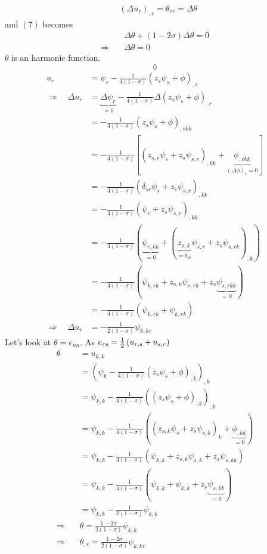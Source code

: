 \begin{align}
&\left(\Delta u_r\right)_{,r}=\theta_{rr}=\Delta \theta
\end{align}
and $(7)$ becomes
\begin{align}
&\Delta \theta+\left(1-2\sigma\right)\Delta \theta = 0\\
\Rightarrow\quad & \Delta \theta=0
\end{align}
$\theta$ is an harmonic function.
$$\lozenge$$
\begin{align}
u_r&=\psi_r-\frac{1}{4\left(1-\sigma\right)}\left(z_s\psi_s+\phi\right)_{,r}\\
\Rightarrow\quad \Delta u_r&=\underbrace{\Delta \psi_r}_{=0}-\frac{1}{4\left(1-\sigma\right)}\Delta \left(z_s\psi_s+ \phi\right)_{,r}\\
&=-\frac{1}{4\left(1-\sigma\right)} \left(z_s\psi_s+  \phi\right)_{,rkk}\\
&=-\frac{1}{4\left(1-\sigma\right)} \left[\left(z_{s,r}\psi_s+z_s\psi_{s,r}\right)_{,kk}+ \underbrace{\phi_{,rkk}}_{\left(\Delta\phi\right)_r=0}\right]\\
&=-\frac{1}{4\left(1-\sigma\right)} \left(\delta_{sr}\psi_s+z_s\psi_{s,r}\right)_{,kk}\\
&=-\frac{1}{4\left(1-\sigma\right)} \left(\psi_r+z_s\psi_{s,r}\right)_{,kk}\\
&=-\frac{1}{4\left(1-\sigma\right)} \left(\underbrace{\psi_{r,kk}}_{=0}+\left(\underbrace{z_{s,k}}_{= \delta_{sk}}\psi_{s,r}+z_s\psi_{s,rk}\right)_{,k}\right)\\
&=-\frac{1}{4\left(1-\sigma\right)} \left(\psi_{k,rk}+z_{s,k}\psi_{s,rk}+z_s\underbrace{\psi_{s,rkk}}_{=0}\right)\\
&=-\frac{1}{4\left(1-\sigma\right)} \left(\psi_{k,rk}+\psi_{k,rk}\right)\\
\Rightarrow\quad \Delta u_r&=-\frac{1}{2\left(1-\sigma\right)} \psi_{k,kr}
\end{align}
Let's look at $\theta=e_{nn}$. As $e_{rs}=\frac{1}{2}\left(u_{r,s}+u_{s,r}\right)$
\begin{align}
\theta &= u_{k,k}\\
&= \left(\psi_k-\frac{1}{4\left(1-\sigma\right)}\left(z_s\psi_s+\phi\right)_{,k}\right)_{,k}\\
&= \psi_{k,k}-\frac{1}{4\left(1-\sigma\right)}\left(\left(z_s\psi_s+\phi\right)_{,k}\right)_{,k}\\
&= \psi_{k,k}-\frac{1}{4\left(1-\sigma\right)}\left(\left(z_{s,k}\psi_s+ z_s\psi_{s,k}\right)_k+\underbrace{\phi_{,kk}}_{=0}\right)\\
&= \psi_{k,k}-\frac{1}{4\left(1-\sigma\right)}\left(\psi_{k,k}+ z_{s,k}\psi_{s,k}+z_s\psi_{s,kk}\right)\\
&= \psi_{k,k}-\frac{1}{4\left(1-\sigma\right)}\left(\psi_{k,k}+ \psi_{k,k}+z_s\underbrace{\psi_{s,kk}}_{=0}\right)\\
&= \psi_{k,k}-\frac{1}{2\left(1-\sigma\right)}\psi_{k,k}\\
\Rightarrow\quad &\theta = \frac{1-2\sigma}{2\left(1-\sigma\right)}\psi_{k,k}\\
\Rightarrow\quad &\theta_{,r} = \frac{1-2\sigma}{2\left(1-\sigma\right)}\psi_{k,kr}
\end{align}
